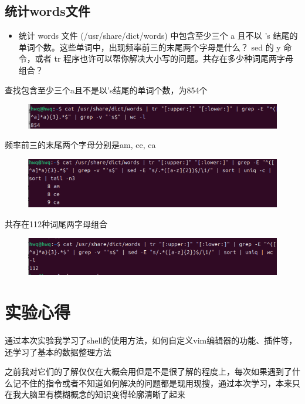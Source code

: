 \documentclass[a4paper, 12pt]{article}
\begin{document}
\subsection{统计words文件}
\begin{itemize}
    \item 统计 words 文件 (/usr/share/dict/words) 中包含至少三个 a 且不以 's 结尾的单词个数。这些单词中，出现频率前三的末尾两个字母是什么？ sed 的 y 命令，或者 tr 程序也许可以帮你解决大小写的问题。共存在多少种词尾两字母组合？

\end{itemize}
查找包含至少三个a且不是以's结尾的单词个数，为854个
\begin{figure}[H]
    \centering
    \includegraphics[width=1\linewidth]{data7.png}
\end{figure}
频率前三的末尾两个字母分别是am, ce, ca
\begin{figure}[H]
    \centering
    \includegraphics[width=1\linewidth]{data8.png}
\end{figure}
共存在112种词尾两字母组合
\begin{figure}[H]
    \centering
    \includegraphics[width=1\linewidth]{data9.png}
\end{figure}
\section{实验心得}
通过本次实验我学习了shell的使用方法，如何自定义vim编辑器的功能、插件等，还学习了基本的数据整理方法\par
之前我对它们的了解仅仅在大概会用但是不是很了解的程度上，每次如果遇到了什么记不住的指令或者不知道如何解决的问题都是现用现搜，通过本次学习，本来只在我大脑里有模糊概念的知识变得轮廓清晰了起来
\end{document}
